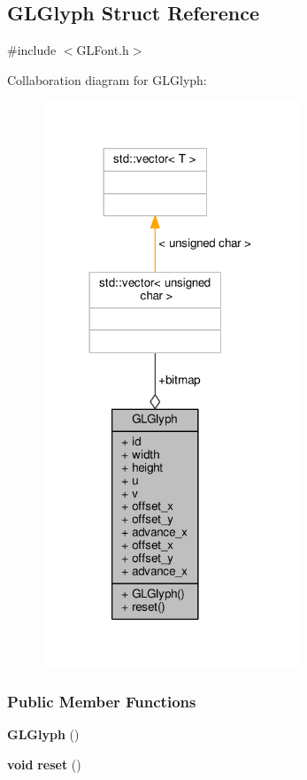 \subsection{G\+L\+Glyph Struct Reference}
\label{structGLGlyph}


{\ttfamily \#include $<$G\+L\+Font.\+h$>$}



Collaboration diagram for G\+L\+Glyph\+:
\nopagebreak
\begin{figure}[H]
\begin{center}
\leavevmode
\includegraphics[width=218pt]{df/d73/structGLGlyph__coll__graph}
\end{center}
\end{figure}
\subsubsection*{Public Member Functions}
\begin{DoxyCompactItemize}
\item 
{\bf G\+L\+Glyph} ()
\item 
{\bf void} {\bf reset} ()
\end{DoxyCompactItemize}
